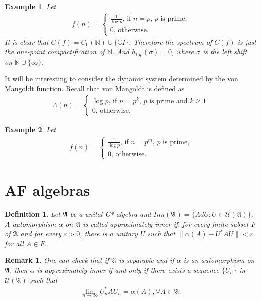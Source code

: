 \documentclass[a4paper,10pt]{amsart}
\newtheorem{example}{Example}[section]
\newtheorem{definition}{Definition}[section]
\newtheorem{remark}{Remark}[section]
\newcommand{\AAA}{\mathfrak A}
\newcommand{\C}{\mathbb C} %
\newcommand{\N}{\mathbb N} %
\begin{document}
\begin{example}
    Let
    \begin{align*}
     f(n) = \begin{cases}
        \frac{1}{\log p}  \mbox{, if $n=p$, $p$ is prime,}\\
        0  \mbox{, otherwise}.
    \end{cases} 
    \end{align*}
    It is clear that $C(f) = C_{0}(\N) \cup \{\C I\}$.
    Therefore the spectrum of $C(f)$ is just the one-point compactification
    of $\N$. And $h_{top}(\sigma) = 0$, where $\sigma$ is the left
    shift on $\N \cup \{\infty\}$.
\end{example}


It will be interesting to consider the dynamic system determined 
by the von Mangoldt function. Recall that von Mangoldt is defined as
\begin{align*}
    \varLambda(n) = \begin{cases}
        \log p  \mbox{, if $n=p^{k}$, $p$ is prime and $k \geq 1$}\\
        0  \mbox{, otherwise}.
    \end{cases}
\end{align*}



\begin{example}
    Let
    \begin{align*}
     f(n) = \begin{cases}
        \frac{1}{\log p}  \mbox{, if $n=p^{m}$, $p$ is prime,}\\
        0  \mbox{, otherwise}.
    \end{cases} 
    \end{align*}
\end{example}

\section{AF algebras}
\begin{definition}
    Let $\AAA$ be a unital C*-algebra and 
    $Inn(\AAA) = \{ Ad U : U \in \mathcal{U}(\AAA)\}$.
    A automorphism $\alpha$ on $\AAA$ is called approximately 
    inner if, for every finite subset $F$ of $\AAA$ and 
    for every $\varepsilon > 0$, there is a unitary $U$ such that
    $\| \alpha(A) - U^{*}AU \| < \varepsilon$ for all $A \in F$.
\end{definition}

\begin{remark}
    One can check that if $\AAA$ is separable and if $\alpha$ is
    an automorphism on $\AAA$, then $\alpha$ is approximately inner
    if and only if there exists a sequence $\{U_{n}\}$ in 
    $\mathcal{U}(\AAA)$ such that 
    \begin{align*}
        \lim_{n \rightarrow \infty}U^{*}_{n}AU_{n} = \alpha(A), 
        \forall A \in \AAA.
    \end{align*}
\end{remark}
\end{document}
